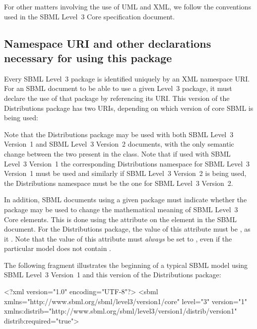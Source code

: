 \documentclass[draftspec]{sbmlpkgspec}
\newcommand{\sbmlthreecore}{SBML Level~3 Core\xspace}
\newcommand{\threeone}{SBML Level~3 Version~1\xspace}
\newcommand{\threetwo}{SBML Level~3 Version~2\xspace}
\newcommand{\DistribBase}{\defRef{DistribBase}{DistribBase-class}}
\newcommand{\distrib}{Distributions\xspace}
\begin{document}
For other matters involving the use of UML and XML, we follow the
conventions used in the SBML Level~3 Core specification document.  


\subsection{Namespace URI and other declarations necessary for using this package}
\label{xml-namespace}

Every SBML Level~3 package is identified uniquely by an XML namespace URI.  For an SBML document to be able to use a given Level~3 package, it must declare the use of that package by referencing its URI.  This version of the \distrib package has two URIs, depending on which version of core SBML is being used:
\begin{center}
\end{center}
\begin{center}
\end{center}


Note that the \distrib package may be used with both \threeone and \threetwo documents, with the only semantic change between the two present in the \DistribBase class. Note that if used with \threeone the corresponding \distrib namespace for \threeone must be used and similarly if \threetwo is being used, the \distrib namespace must be the one for \threetwo.


In addition, SBML documents using a given package must indicate whether the package may be used to change the mathematical meaning of \sbmlthreecore elements.  This is done using the attribute  on the  element in the SBML document.  For the \distrib package, the value of this attribute must be , as it .  Note that the value of this attribute must \emph{always} be set to , even if the particular model does not contain .

The following fragment illustrates the beginning of a typical SBML model using \threeone and this version of the \distrib package:

\begin{example}
<?xml version="1.0" encoding="UTF-8"?>
<sbml xmlns="http://www.sbml.org/sbml/level3/version1/core" level="3" version="1"
      xmlns:distrib="http://www.sbml.org/sbml/level3/version1/distrib/version1"
      distrib:required="true">
\end{example}
\end{document}
